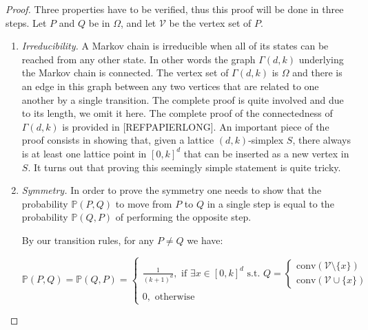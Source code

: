 \documentclass[a4paper]{article}
\begin{document}
\begin{proof}
  Three properties have to be verified, thus this proof will be done in three steps. Let $P$ and $Q$ be in $\Omega$, and let $\mathcal{V}$ be the vertex set of $P$.

  \begin{enumerate}[i]
    \item \textit{Irreducibility.}
    A Markov chain is irreducible when all of its states can be reached from any other state. In other words the graph $\Gamma(d,k)$ underlying the Markov chain is connected. The vertex set of $\Gamma(d, k)$ is $\Omega$ and there is an edge in this graph between any two vertices that are related to one another by a single transition. The complete proof is quite involved and due to its length, we omit it here. The complete proof of the connectedness of $\Gamma(d,k)$ is provided in [REFPAPIERLONG]. An important piece of the proof consists in showing that, given a lattice $(d,k)$-simplex $S$, there always is at least one lattice point in $[0,k]^d$ that can be inserted as a new vertex in $S$. It turns out that proving this seemingly simple statement is quite tricky.

    \item \textit{Symmetry.}
    In order to prove the symmetry one needs to show that the probability $\mathbb{P}(P,Q)$ to move from $P$ to $Q$ in a single step is equal to the probability $\mathbb{P}(Q,P)$ of performing the opposite step.

    By our transition rules, for any $P \neq Q$ we have:

    $$
      \mathbb{P}(P,Q)=\mathbb{P}(Q,P) =
      \begin{cases}
        \frac{1}{(k+1)^d}, \text{ if } \exists x \in [0,k]^d \text{ s.t. } Q=
          \begin{cases}
            \mathrm{conv}(\mathcal{V}\mathord{\setminus}\{x\})\\
            \mathrm{conv}(\mathcal{V}\cup\{x\})
          \end{cases}
        \\
        0, \text{ otherwise }
      \end{cases}
    $$


\end{enumerate}
\end{proof}
\end{document}
